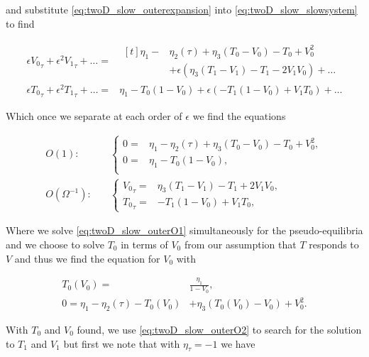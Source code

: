 and substitute \eqref{eq:twoD_slow_outerexpansion} into \eqref{eq:twoD_slow_slowsystem} to find

\begin{equation*}
\begin{aligned}
 \epsilon{V_0}_\tau+\epsilon^2{V_1}_\tau+\ldots =&\begin{aligned}[t]
\eta_1-&\eta_2(\tau)+\eta_3(T_0-V_0)-T_0+V_0^2\\
&+\epsilon(\eta_3(T_1-V_1)-T_1-2V_1V_0)+\ldots
\end{aligned}\\
\epsilon{T_0}_\tau+\epsilon^2{T_1}_\tau+\ldots=&\eta_1-T_0(1-V_0)+\epsilon(-T_1(1-V_0)+V_1T_0)+\ldots
\end{aligned}
\end{equation*}

Which once we separate at each order of $\epsilon$ we find the equations

\begin{align}
\label{eq:twoD_slow_outerO1}
O(1):\quad & \begin{cases}
	0 =& \eta_1-\eta_2(\tau)+\eta_3(T_0-V_0)-T_0+V_0^2 , \\
	0 =&  \eta_1-T_0(1-V_0),\\
\end{cases}\\
\label{eq:twoD_slow_outerO2}
O(\Omega^{-1}):\quad & \begin{cases}
	{V_0}_\tau = & \eta_3(T_1-V_1)-T_1+2V_1V_0,\\
	{T_0}_\tau =&  -T_1(1-V_0)+V_1T_0,
\end{cases}
\end{align}

Where we solve \eqref{eq:twoD_slow_outerO1} simultaneously for the pseudo-equilibria and we choose to solve $T_0$ in terms of $V_0$ from our assumption that $T$ responds to $V$ and thus we find the equation for $V_0$ with

\begin{equation}\label{eq:twoD_slow_equilibria}
\begin{aligned}
T_0(V_0)=&\frac{\eta_1}{1-V_0},\\
0=\eta_1-\eta_2(\tau)-T_0(V_0)&+\eta_3(T_0(V_0)-V_0)+V_0^2.
\end{aligned}
\end{equation}

With $T_0$ and $V_0$ found, we use \eqref{eq:twoD_slow_outerO2} to search for the solution to $T_1$ and $V_1$ but first we note that with $\eta_\tau =-1$ we have

